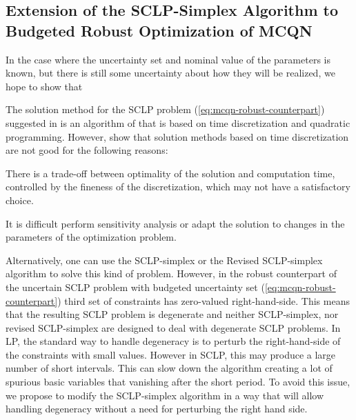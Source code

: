 \documentclass[11pt,a4paper,titlepage]{article}
\theoremstyle{definition}
\theoremstyle{plain}
\begin{document}
    \subsection{Extension of the SCLP-Simplex Algorithm to Budgeted Robust Optimization of MCQN}
    \label{subsec:topics:robust-sclp-extension}

    In the case where the uncertainty set and nominal value of the parameters is known,
    but there is still some uncertainty about how they will be realized,
    we hope to show that

    The solution method for the SCLP problem (\ref{eq:mcqn-robust-counterpart}) suggested in \autocite{bertsimas2014robust}
    is an algorithm of \autocite{luo1998new}
    that is based on time discretization and quadratic programming.
    However,
    \autocite{shindin2021application} show that solution methods based on time discretization are not good for the following reasons:
    \begin{compactitem}
        \item
        There is a trade-off between optimality of the solution and computation time,
        controlled by the fineness of the discretization,
        which may not have a satisfactory choice.
        \item
        It is difficult perform sensitivity analysis or adapt the solution to changes in the parameters of the optimization problem.
    \end{compactitem}
    Alternatively, one can use the SCLP-simplex \autocite{weiss2008simplex}
    or the Revised SCLP-simplex \autocite{shindin2021application}
    algorithm to solve this kind of problem.
    However, in the  robust  counterpart of the uncertain SCLP problem with budgeted uncertainty set (\ref{eq:mcqn-robust-counterpart}) third set of constraints has zero-valued right-hand-side.
    This means that the resulting SCLP problem is degenerate and neither SCLP-simplex,
    nor revised SCLP-simplex are designed to deal with degenerate SCLP problems.
    In LP,
    the standard way to handle degeneracy is to perturb the right-hand-side
    of the constraints with small values.
    However in SCLP, this may produce a large number of short intervals.
    This can slow down the algorithm creating a lot of spurious basic variables that vanishing after the short period.
    To avoid this issue,
    we propose to modify the SCLP-simplex algorithm in a way that will allow handling degeneracy without a need for perturbing the right hand side.
\end{document}
